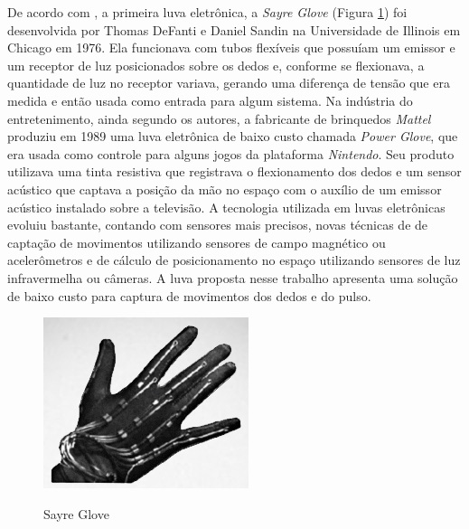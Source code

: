 De acordo com , a primeira luva eletrônica, a \textit{Sayre Glove} (Figura \ref{fig:sayre}) foi desenvolvida por Thomas DeFanti e Daniel Sandin na Universidade de Illinois em Chicago em 1976. Ela funcionava com tubos flexíveis que possuíam um emissor e um receptor de luz posicionados sobre os dedos e, conforme se flexionava, a quantidade de luz no receptor variava, gerando uma diferença de tensão que era medida e então usada como entrada para algum sistema. Na indústria do entretenimento, ainda segundo os autores, a fabricante de brinquedos \textit{Mattel} produziu em 1989 uma luva eletrônica de baixo custo chamada \textit{Power Glove}, que era usada como controle para alguns jogos da plataforma \textit{Nintendo}. Seu produto utilizava uma tinta resistiva que registrava o flexionamento dos dedos e um sensor acústico que captava a posição da mão no espaço com o auxílio de um emissor acústico instalado sobre a televisão. A tecnologia utilizada em luvas eletrônicas evoluiu bastante, contando com sensores mais precisos, novas técnicas de de captação de movimentos utilizando sensores de campo magnético \cite{fahn2005development} ou acelerômetros \cite{kim20093} e de cálculo de posicionamento no espaço utilizando sensores de luz infravermelha ou câmeras. A luva proposta nesse trabalho apresenta uma solução de baixo custo para captura de movimentos dos dedos e do pulso.

\begin{figure}[h]
  \setlength{\abovecaptionskip}{0pt}
  \setlength{\belowcaptionskip}{0pt}
  \caption[Sayre Glove]{Sayre Glove}
  \centering
  \includegraphics[width=.4\textwidth]{imagem/sayreGlove}
  \captionsetup{justification=centering}
  \label{fig:sayre}
\end{figure}

